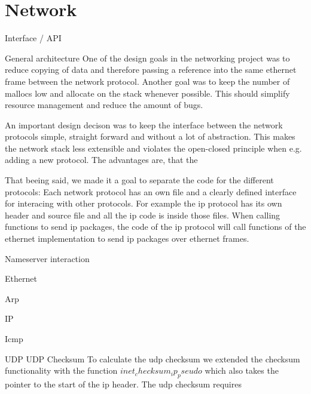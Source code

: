 \chapter{Network}

Interface / API

General architecture
One of the design goals in the networking project was to reduce copying of data and therefore passing a reference into the same ethernet frame between the network protocol. Another goal was to keep the number of mallocs low and allocate on the stack whenever possible. This should simplify resource management and reduce the amount of bugs.

An important design decison was to keep the interface between the network protocols simple, straight forward and without a lot of abstraction. This makes the network stack less extensible and violates the open-closed principle when e.g. adding a new protocol. The advantages are, that the

That beeing said, we made it a goal to separate the code for the different protocols: Each network protocol has an own file and a clearly defined interface for interacing with other protocols. For example the ip protocol has its own header and source file and all the ip code is inside those files. When calling functions to send ip packages, the code of the ip protocol will call functions of the ethernet implementation to send ip packages over ethernet frames.

Nameserver interaction

Ethernet

Arp

IP

Icmp

UDP
UDP Checksum
To calculate the udp checksum we extended the checksum functionality with the function $inet_checksum_ip_pseudo$ which also takes the pointer to the start of the ip header. The udp checksum requires 
